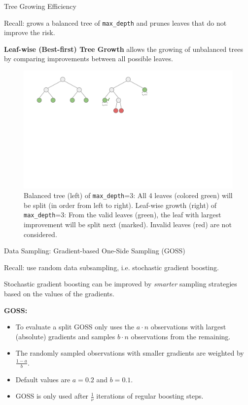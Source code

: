 \documentclass[11pt,compress,t,notes=noshow, xcolor=table]{beamer}
\begin{document}
\begin{vbframe}{Tree Growing Efficiency}

Recall:  grows a balanced tree of \texttt{max\_depth} and prunes leaves that do not improve the risk.

\lz

\textbf{Leaf-wise (Best-first) Tree Growth} allows the growing of unbalanced trees by comparing improvements between all possible leaves.

\lz

\begin{figure}
\includegraphics[trim=0 260 230 20, clip, width=\textwidth,page=1]{figure_man/trees_balance.pdf}
\caption*{\scriptsize Balanced tree (left) of \texttt{max\_depth}=3: All 4 leaves (colored green) will be split (in order from left to right).
Leaf-wise growth (right) of \texttt{max\_depth}=3: From the valid leaves (green), the leaf with largest improvement will be split next (marked). Invalid leaves (red) are not considered.}
\end{figure}

\end{vbframe}

\begin{vbframe}{Data Sampling: Gradient-based One-Side Sampling (GOSS)}

Recall:  use random data subsampling, i.e. stochastic gradient boosting.

\lz

Stochastic gradient boosting can be improved by \emph{smarter} sampling strategies based on the values of the gradients.

\lz

\textbf{GOSS:}
\begin{itemize}
  \item To evaluate a split GOSS only uses the $a\cdot n$ observations with largest (absolute) gradients and samples $b\cdot n$ observations from the remaining.
  \item The randomly sampled observations with smaller gradients are weighted by $\frac{1 - a}{b}$.
  \item Default values are $a=0.2$ and $b=0.1$.
  \item GOSS is only used after $\frac{1}{\nu}$ iterations of regular boosting steps.
\end{itemize}


\end{vbframe}
\end{document}
